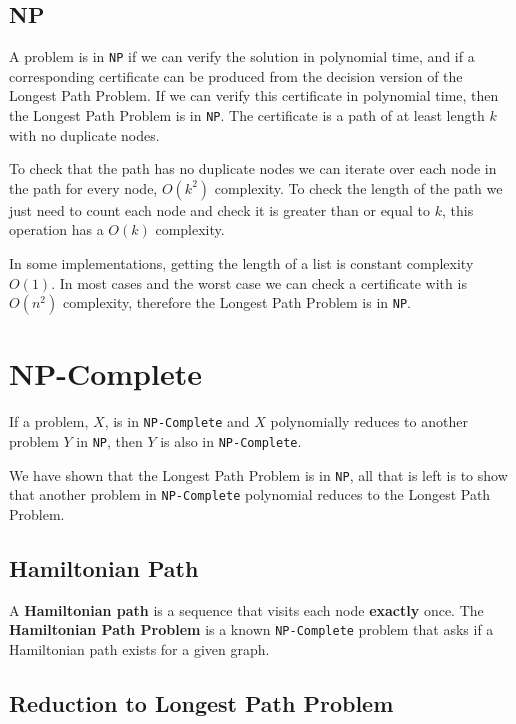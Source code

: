 \documentclass[a4paper,11pt]{article}
\begin{document}
\subsection{NP}

A problem is in \verb|NP| if we can verify the solution in polynomial time, and
if a corresponding certificate can be produced from the decision version of the
Longest Path Problem. If we can verify this certificate in polynomial time, then
the Longest Path Problem is in \verb|NP|. The certificate is a path of at least
length $k$ with no duplicate nodes.

To check that the path has no duplicate nodes we can iterate over each node in
the path for every node, $O(k^2)$ complexity. To check the length of the path we
just need to count each node and check it is greater than or equal to $k$, this
operation has a $O(k)$ complexity.

In some implementations, getting the length of a list is constant complexity
$O(1)$. In most cases and the worst case we can check a certificate with is
$O(n^2)$ complexity, therefore the Longest Path Problem is in \verb|NP|.

\section{NP-Complete}

If a problem, $X$, is in \verb|NP-Complete| and $X$ polynomially reduces to another
problem $Y$ in \verb|NP|, then $Y$ is also in \verb|NP-Complete|.

We have shown that the Longest Path Problem is in \verb|NP|, all that is left is
to show that another problem in \verb|NP-Complete| polynomial reduces to the
Longest Path Problem.

\subsection{Hamiltonian Path}

A \textbf{Hamiltonian path} is a sequence that visits each node \textbf{exactly}
once. The \textbf{Hamiltonian Path Problem} is a known \verb|NP-Complete| problem that
asks if a Hamiltonian path exists for a given graph.

\subsection{Reduction to Longest Path Problem}
\end{document}
